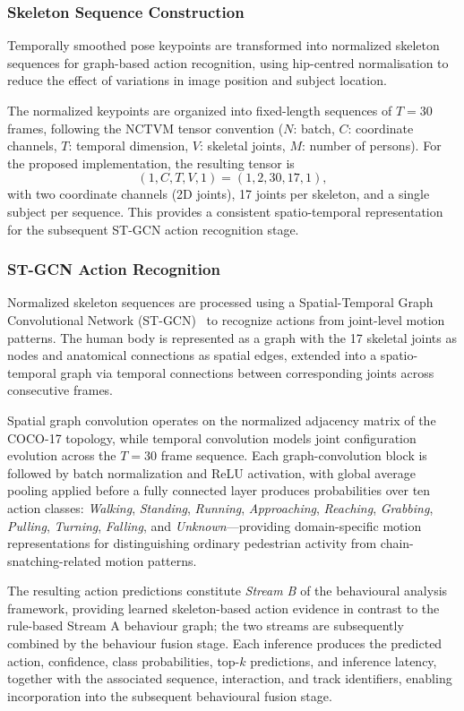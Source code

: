 \documentclass[runningheads]{llncs}
\begin{document}
\subsubsection{Skeleton Sequence Construction}
Temporally smoothed pose keypoints are transformed into normalized
skeleton sequences for graph-based action recognition, using
hip-centred normalisation to reduce the effect of variations in image
position and subject location.

The normalized keypoints are organized into fixed-length sequences of
$T=30$ frames, following the NCTVM tensor convention ($N$: batch,
$C$: coordinate channels, $T$: temporal dimension, $V$: skeletal
joints, $M$: number of persons). For the proposed implementation, the
resulting tensor is
\begin{equation}
(1,C,T,V,1)=(1,2,30,17,1),
\end{equation}
with two coordinate channels (2D joints), 17 joints per skeleton, and a
single subject per sequence. This provides a consistent spatio-temporal
representation for the subsequent ST-GCN action recognition stage.

\subsubsection{ST-GCN Action Recognition}
Normalized skeleton sequences are processed using a Spatial-Temporal
Graph Convolutional Network (ST-GCN)~\cite{yan2018stgcn} to recognize actions
from joint-level motion patterns. The human body is represented as a
graph with the 17 skeletal joints as nodes and anatomical connections
as spatial edges, extended into a spatio-temporal graph via temporal
connections between corresponding joints across consecutive frames.

Spatial graph convolution operates on the normalized adjacency matrix
of the COCO-17 topology, while temporal convolution models joint
configuration evolution across the $T=30$ frame sequence. Each
graph-convolution block is followed by batch normalization and ReLU
activation, with global average pooling applied before a fully
connected layer produces probabilities over ten action classes:
\textit{Walking}, \textit{Standing}, \textit{Running},
\textit{Approaching}, \textit{Reaching}, \textit{Grabbing},
\textit{Pulling}, \textit{Turning}, \textit{Falling}, and
\textit{Unknown}—providing domain-specific motion representations for
distinguishing ordinary pedestrian activity from chain-snatching-related
motion patterns.

The resulting action predictions constitute \textit{Stream B} of the
behavioural analysis framework, providing learned skeleton-based action
evidence in contrast to the rule-based Stream A behaviour graph; the two
streams are subsequently combined by the behaviour fusion stage. Each
inference produces the predicted action, confidence, class
probabilities, top-$k$ predictions, and inference latency, together
with the associated sequence, interaction, and track identifiers,
enabling incorporation into the subsequent behavioural fusion stage.
\end{document}
